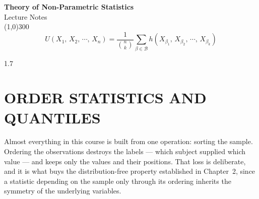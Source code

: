 \documentclass[12pt,a4paper]{report}
\theoremstyle{definition}
\theoremstyle{plain}
\begin{document}
\begin{titlepage}
\begin{center}
\vspace*{3cm}
{\Huge\bfseries Theory of Non-Parametric Statistics}\\[1.2cm]
{\large Lecture Notes}\\[2.5cm]
\line(1,0){300}\\[1.5cm]
$$U\left(X_1,\, X_2,\, \cdots,\, X_n\right)
= \frac{1}{\binom{n}{k}}\sum_{\beta\in\mathcal{B}}
h\left(X_{\beta_1},\, X_{\beta_2},\, \cdots,\, X_{\beta_k}\right)$$
\end{center}
\end{titlepage}

















\newpage

\begin{spacing}{1.7}
\tableofcontents
{}
\end{spacing}











\newpage
\chapter{ORDER STATISTICS AND QUANTILES}

Almost everything in this course is built from one operation: sorting the
sample. Ordering the observations destroys the labels --- which subject supplied
which value --- and keeps only the values and their positions. That loss is
deliberate, and it is what buys the distribution-free property established in
Chapter~2, since a statistic depending on the sample only through its ordering
inherits the symmetry of the underlying variables.
\end{document}

